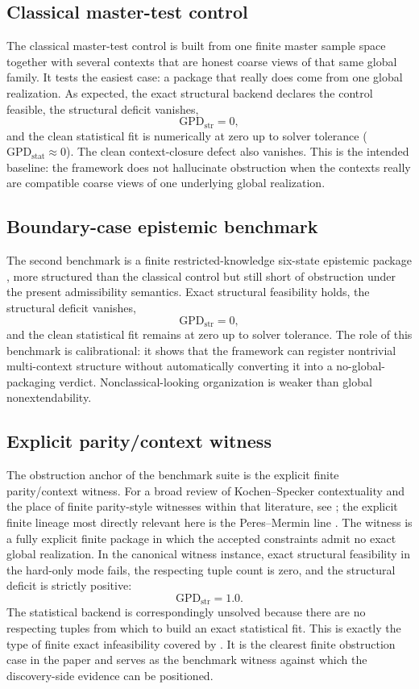 \documentclass[11pt]{article}
\newcommand{\GPDstr}{\mathrm{GPD}_{\mathrm{str}}}
\newcommand{\GPDstat}{\mathrm{GPD}_{\mathrm{stat}}}
\theoremstyle{definition}
\begin{document}
\subsection{Classical master-test control}

The classical master-test control is built from one finite master sample space together with several contexts that are honest coarse views of that same global family. It tests the easiest case: a package that really does come from one global realization. As expected, the exact structural backend declares the control feasible, the structural deficit vanishes,
\[
\GPDstr = 0,
\]
and the clean statistical fit is numerically at zero up to solver tolerance (\(\GPDstat \approx 0\)). The clean context-closure defect also vanishes. This is the intended baseline: the framework does not hallucinate obstruction when the contexts really are compatible coarse views of one underlying global realization.

\subsection{Boundary-case epistemic benchmark}

The second benchmark is a finite restricted-knowledge six-state epistemic package \citep{Spekkens2007ToyTheory}, more structured than the classical control but still short of obstruction under the present admissibility semantics. Exact structural feasibility holds, the structural deficit vanishes,
\[
\GPDstr = 0,
\]
and the clean statistical fit remains at zero up to solver tolerance. The role of this benchmark is calibrational: it shows that the framework can register nontrivial multi-context structure without automatically converting it into a no-global-packaging verdict. Nonclassical-looking organization is weaker than global nonextendability.

\subsection{Explicit parity/context witness}

The obstruction anchor of the benchmark suite is the explicit finite parity/context witness. For a broad review of Kochen--Specker contextuality and the place of finite parity-style witnesses within that literature, see \citet{BudroniEtAl2022KochenSpecker}; the explicit finite lineage most directly relevant here is the Peres--Mermin line \citep{Peres1990IncompatibleResults,Mermin1993HiddenVariables}. The witness is a fully explicit finite package in which the accepted constraints admit no exact global realization. In the canonical witness instance, exact structural feasibility in the hard-only mode fails, the respecting tuple count is zero, and the structural deficit is strictly positive:
\[
\GPDstr = 1.0.
\]
The statistical backend is correspondingly unsolved because there are no respecting tuples from which to build an exact statistical fit. This is exactly the type of finite exact infeasibility covered by . It is the clearest finite obstruction case in the paper and serves as the benchmark witness against which the discovery-side evidence can be positioned.
\end{document}
